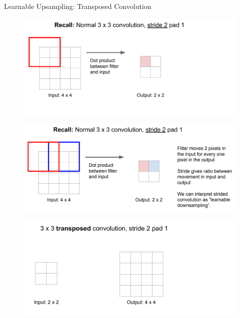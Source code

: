 \documentclass[10pt]{beamer}
\theoremstyle{remark}
\theoremstyle{definition}
\begin{document}
\begin{frame}[allowframebreaks]{Learnable Upsampling: Transposed Convolution}
\begin{figure}
\centering
\includegraphics[width=1.0\textwidth,height=1.0\textheight,keepaspectratio]{./images/upsample_3.png}
\end{figure}

\framebreak

\begin{figure}
\centering
\includegraphics[width=1.0\textwidth,height=1.0\textheight,keepaspectratio]{./images/upsample_4.png}
\end{figure}

\framebreak

\begin{figure}
\centering
\includegraphics[width=1.0\textwidth,height=1.0\textheight,keepaspectratio]{./images/upsample_5.png}
\end{figure}


\end{frame}
\end{document}
